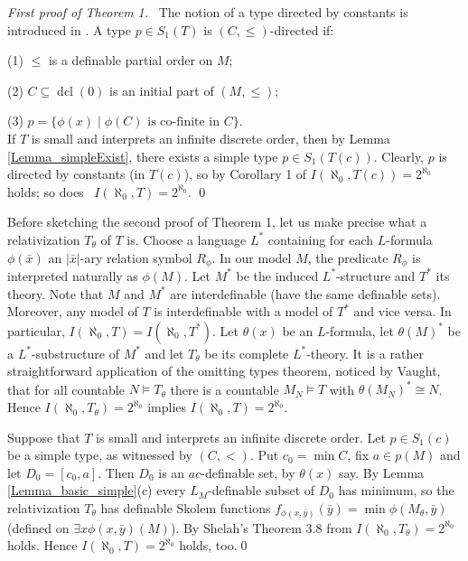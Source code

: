 \documentclass[12pt]{amsart}
\theoremstyle{definition}
\DeclareMathOperator{\dcl}{dcl}
\begin{document}
\noindent
{\it First proof of Theorem 1.} \ The notion of a type directed by constants is introduced in \cite{T}.  A type $p\in S_1(T)$ is $(C,\leq)$-directed  if:
 
 (1)  $\leq$ is a definable partial order on $M$; 
 
 (2)  $C\subseteq \dcl(0)$  is an initial part of $(M,\leq)$;

  (3) $p=\{\phi(x)\mid \mbox{$\phi(C)$ is co-finite in $C$}\} $.\\
If $T$ is small and interprets an infinite discrete order, then by Lemma \ref{Lemma_simpleExist}, there exists  a simple type $p\in S_1(T(c))$. Clearly, $p$ is directed  by constants (in $T(c)$), so by Corollary 1 of \cite{T}  $I(\aleph_0,T(c))=2^{\aleph_0}$ holds; so does \  $I(\aleph_0,T)=2^{\aleph_0}$.  \qed

\medskip
Before sketching the second proof of Theorem 1, let us make precise  what a relativization   $T_{\theta}$ of $T$ is.
Choose a language $L^*$ containing for each $L$-formula $\phi(\bar x)$ an $|\bar x|$-ary relation symbol $R_{\phi}$. In our model $M$, the predicate $R_{\phi}$ is interpreted naturally as $\phi(M)$. Let $M^*$ be the induced  $L^*$-structure and $T^*$ its theory. Note that $M$ and $M^*$ are interdefinable (have the same  definable sets). Moreover, any model of $T$ is interdefinable with  a model of $T^*$ and vice versa.  In particular, $I(\aleph_0,T)=I(\aleph_0,T^*)$. 
Let $\theta(x)$  be an $L$-formula, let $\theta(M)^* $ be a $L^*$-substructure of $M^*$ and let $T_{\theta}$ be its complete $L^*$-theory. It is a rather straightforward application of the omitting types theorem, noticed by Vaught, that for all countable  $N\models T_{\theta}$ there is a countable $M_N\models T$ with $\theta(M_N)^*\cong N$. Hence $I(\aleph_0,T_{\theta})=2^{\aleph_0}$ implies $I(\aleph_0,T)=2^{\aleph_0}$.

\medskip 
{} 
Suppose that $T$ is small and   interprets an infinite discrete order. Let $p\in S_1(c)$ be a simple type, as witnessed by $(C,<)$. Put $c_0=\min C$, fix $a\in p(M)$ and let $D_0=[c_0,a]$.
Then $D_0$ is an $ac$-definable set, by $\theta(x)$ say. By Lemma \ref{Lemma_basic_simple}(c) every $L_M$-definable subset of $D_0$ has minimum, so the relativization $T_{\theta}$ has definable   Skolem functions $f_{\phi(x,\bar y)}(\bar y)=\min\phi(M_{\theta},\bar y)$ (defined on $\exists x\phi (x,\bar y) (M)$). By Shelah's Theorem 3.8 from \cite{Sh}  $I(\aleph_0,T_{\theta})=2^{\aleph_0}$ holds. Hence $I(\aleph_0,T)=2^{\aleph_0}$ holds, too.\qed  
 
\end{document}

